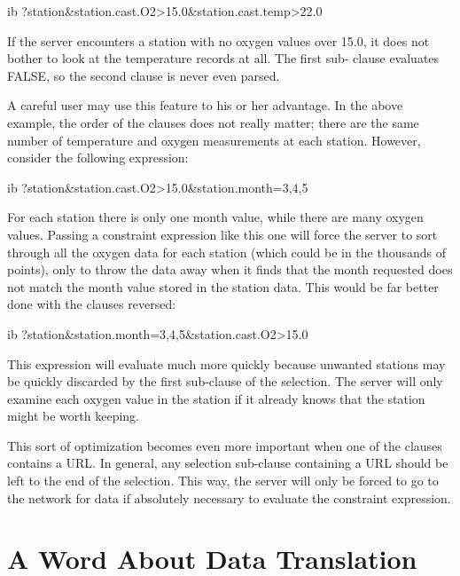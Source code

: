 \begin{vcode}{ib}
?station&station.cast.O2>15.0&station.cast.temp>22.0
\end{vcode}

If the server encounters a station with no oxygen values over 15.0, it
does not bother to look at the temperature records at all. The first sub-
clause evaluates FALSE, so the second clause is never even parsed.

A careful user may use this feature to his or her advantage. In the
above example, the order of the clauses does not really matter; there
are the same number of temperature and oxygen measurements at each
station.  However, consider the following expression:


\begin{vcode}{ib}
?station&station.cast.O2>15.0&station.month={3,4,5}
\end{vcode}

For each station there is only one month value, while there are many
oxygen values. Passing a constraint expression like this one will
force the server to sort through all the oxygen data for each station
(which could be in the thousands of points), only to throw the data
away when it finds that the month requested does not match the month
value stored in the station data. This would be far better done with
the clauses reversed:

\begin{vcode}{ib}
?station&station.month={3,4,5}&station.cast.O2>15.0
\end{vcode}

This expression will evaluate much more quickly because unwanted
stations may be quickly discarded by the first sub-clause of the
selection. The server will only examine each oxygen value in the
station if it already knows that the station might be worth keeping.

This sort of optimization becomes even more important when one of the
clauses contains a URL. In general, any selection sub-clause
containing a URL should be left to the end of the selection. This way,
the \opendap server will only be forced to go to the network for data if
absolutely necessary to evaluate the constraint expression.  

\section{A Word About Data Translation}
\label{opd-client,trans}

